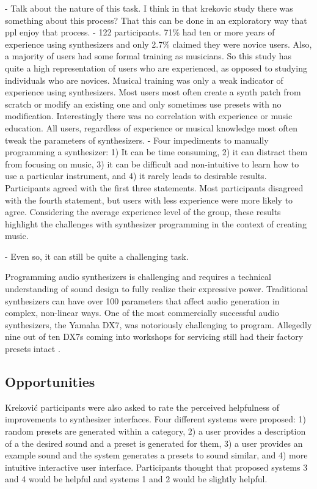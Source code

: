 - Talk about the nature of this task. I think in that krekovic study there was something about this process? That this can be done in an exploratory way that ppl enjoy that process. \cite{krekovic2019insights}
- 122 participants. 71\% had ten or more years of experience using synthesizers and only 2.7\% claimed they were novice users. Also, a majority of users had some formal training as musicians. So this study has quite a high representation of users who are experienced, as opposed to studying individuals who are novices. Musical training was only a weak indicator of experience using synthesizers. Most users most often create a synth patch from scratch or modify an existing one and only sometimes use presets with no modification. Interestingly there was no correlation with experience or music education. All users, regardless of experience or musical knowledge most often tweak the parameters of synthesizers.
- Four impediments to manually programming a synthesizer: 1) It can be time consuming, 2) it can distract them from focusing on music, 3) it can be difficult and non-intuitive to learn how to use a particular instrument, and 4) it rarely leads to desirable results. Participants agreed with the first three statements. Most participants disagreed with the fourth statement, but users with less experience were more likely to agree. Considering the average experience level of the group, these results highlight the challenges with synthesizer programming in the context of creating music.

- Even so, it can still be quite a challenging task.

Programming audio synthesizers is challenging and requires a technical understanding of sound design to fully realize their expressive power. Traditional synthesizers can have over 100 parameters that affect audio generation in complex, non-linear ways. One of the most commercially successful audio synthesizers, the Yamaha DX7, was notoriously challenging to program. Allegedly nine out of ten DX7s coming into workshops for servicing still had their factory presets intact \cite{seago2004critical}.

\subsection{Opportunities}
Krekovi\'{c} \cite{krekovic2019insights} participants were also asked to rate the perceived helpfulness of improvements to synthesizer  interfaces. Four different systems were proposed: 1) random presets are generated within a category, 2) a user provides a description of a the desired sound and a preset is generated for them, 3) a user provides an example sound and the system generates a presets to sound similar, and 4) more intuitive interactive user interface. Participants thought that proposed systems 3 and 4 would be helpful and systems 1 and 2 would be slightly helpful.
